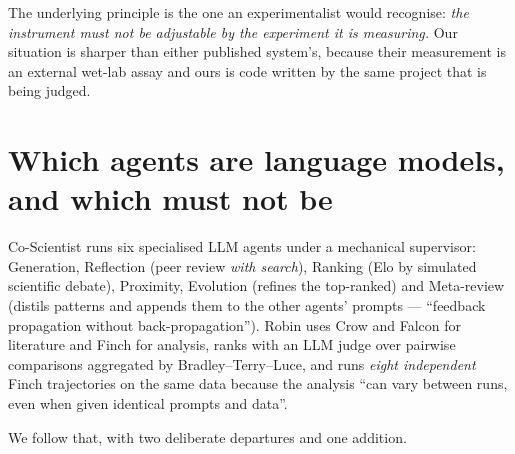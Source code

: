 \documentclass[11pt]{article}
\begin{document}
The underlying principle is the one an experimentalist would recognise: \emph{the instrument must
not be adjustable by the experiment it is measuring.} Our situation is sharper than either
published system's, because their measurement is an external wet-lab assay and ours is code
written by the same project that is being judged.


\section{Which agents are language models, and which must not be}
\label{sec:whichllm}

Co-Scientist runs six specialised LLM agents under a mechanical supervisor: Generation,
Reflection (peer review \emph{with search}), Ranking (Elo by simulated scientific debate),
Proximity, Evolution (refines the top-ranked) and Meta-review (distils patterns and appends them
to the other agents' prompts --- ``feedback propagation without back-propagation''). Robin uses
Crow and Falcon for literature and Finch for analysis, ranks with an LLM judge over pairwise
comparisons aggregated by Bradley--Terry--Luce, and runs \emph{eight independent} Finch
trajectories on the same data because the analysis ``can vary between runs, even when given
identical prompts and data''.

We follow that, with two deliberate departures and one addition.
\end{document}
